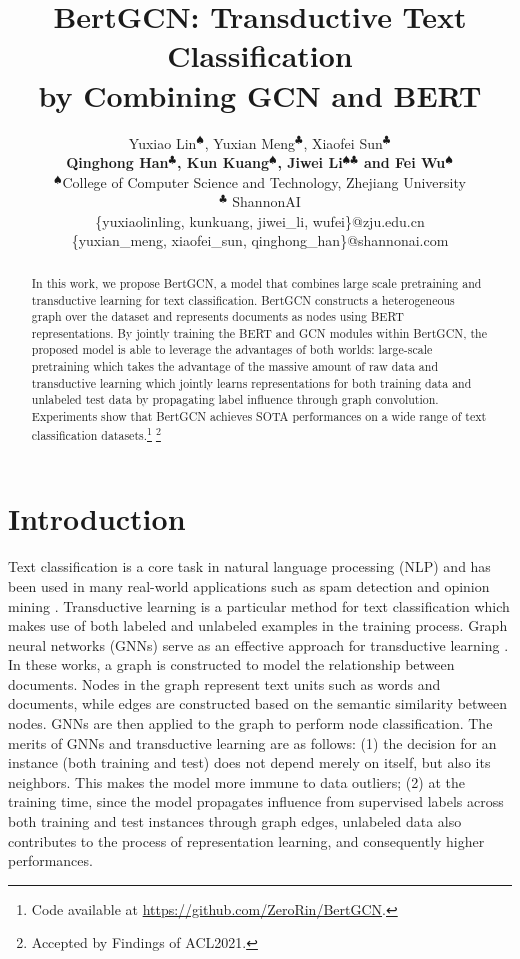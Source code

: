 \documentclass[11pt,a4paper]{article}
\title{BertGCN: Transductive Text Classification \\ by Combining GCN and BERT}
\author{Yuxiao Lin$^\spadesuit$, Yuxian Meng$^\clubsuit$, Xiaofei Sun$^\clubsuit$\\
{\bf Qinghong Han$^\clubsuit$,  Kun Kuang$^\spadesuit$,
Jiwei Li$^{\spadesuit\clubsuit}$ and Fei Wu$^\spadesuit$}\\
$^\spadesuit$College of Computer Science and Technology, Zhejiang University\\ 
$^\clubsuit$ ShannonAI \\
\{yuxiaolinling, kunkuang, jiwei\_li, wufei\}@zju.edu.cn\\
\{yuxian\_meng, xiaofei\_sun, qinghong\_han\}@shannonai.com
}
\begin{document}
\maketitle

\begin{abstract}
In this work, we propose BertGCN, a model that combines large scale pretraining and transductive learning for text classification. BertGCN constructs a  heterogeneous graph over the dataset and represents documents as nodes using BERT representations. By jointly training the BERT and GCN modules within BertGCN, the proposed model is able to leverage the advantages of both worlds: large-scale pretraining which takes the advantage of the massive amount of raw data and transductive learning which jointly learns representations for both training data and unlabeled test data by propagating label influence through graph convolution. Experiments show that BertGCN achieves SOTA performances on a wide range of text classification datasets.\footnote{Code available at \url{https://github.com/ZeroRin/BertGCN}.}
\footnote{Accepted by Findings of ACL2021.}
\end{abstract}


\section{Introduction}
Text classification is a core task in natural language processing (NLP) and has been used in many real-world applications such as spam detection \citep{wang2010don} and opinion mining \citep{bakshi2016opinion}.
Transductive learning \citep{Vapnik1998} is a particular method for text classification which makes use of both labeled and unlabeled  examples in the training process.
Graph neural networks (GNNs) serve as an effective approach for transductive learning \citep{yao2019graph,liu2020tensor}. 
In these works, a graph is constructed to model the relationship between documents. Nodes in the graph represent text units such as words and documents, while edges are constructed based on the semantic similarity between nodes. GNNs are then applied to the graph to perform node classification. 
The merits of GNNs and transductive learning are as follows:
(1) the decision for an instance (both training and test) does not depend merely on itself, but also its neighbors. This makes the model more immune to data outliers; 
(2) at the training time, since the model propagates influence from supervised labels across both training and test instances through graph edges,  unlabeled data also contributes to the process of representation learning, and consequently higher performances.   
\end{document}
